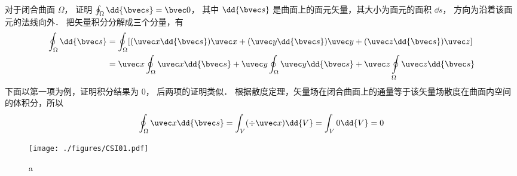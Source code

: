 

对于闭合曲面 $\Omega$，  证明 $\oint_\Omega  \dd{\bvec s} = \bvec 0$， 其中 $\dd{\bvec s}$ 是曲面上的面元矢量，其大小为面元的面积 $\dd{s}$，  方向为沿着该面元的法线向外．
把矢量积分分解成三个分量，有
\begin{equation}
\begin{aligned}
\oint_\Omega  \dd{\bvec s} & = \oint_\Omega  [(\uvec x \dd{\bvec s})\uvec x + (\uvec y \dd{\bvec s})\uvec y + (\uvec z \dd{\bvec s})\uvec z] \\
&= \uvec x\oint_\Omega  \uvec x \dd{\bvec s}  + \uvec y\oint_\Omega \uvec y \dd{\bvec s} + \uvec z\oint\limits_\Omega \uvec z \dd{\bvec s}
\end{aligned}
\end{equation}
下面以第一项为例，证明积分结果为 0， 后两项的证明类似．
根据散度定理，矢量场在闭合曲面上的通量等于该矢量场散度在曲面内空间的体积分，所以
\begin{equation}
\oint_\Omega  \uvec x \dd{\bvec s}  = \int_V (\div \uvec x) \dd{V}  = \int_V 0 \dd{V}  = 0
\end{equation}
\begin{figure}[ht]
\centering
\texttt{[image: ./figures/CSI01.pdf]}
\caption{a} \label{CSI0_fig1}
\end{figure}

 
 

